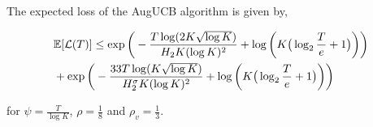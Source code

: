 \begin{theorem}
\label{Result:Theorem:1}

The expected loss of the AugUCB algorithm is given by,
\begin{small}
\begin{align*}
&\mathbb{E}[\mathcal{L}(T)] \leq \exp\bigg( -\frac{T\log (2 K\sqrt{\log K})}{H_2 K (\log K)^2} + \log\bigg(K\big(\log_2\frac{T}{e}+1\big)\bigg)\bigg)\\
& + \exp\bigg(- \frac{33T\log ( K\sqrt{\log K})}{H_{2}^{\sigma} K(\log K)^2}  + \log\bigg(K\big(\log_2\frac{T}{e}+1\big)\bigg)\bigg) 
\end{align*}
\end{small}

for $\psi=\frac{T}{\log K}$, $\rho=\frac{1}{8}$ and $\rho_v=\frac{1}{3}$.


\end{theorem}


